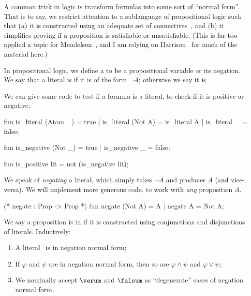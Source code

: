 \begin{node}\label{prop-000P}%
A common trick in logic is transform formulas into some sort of
``normal form''. That is to say, we restrict attention to a sublanguage
of propositional logic such that (a) it is constructed using an adequate
set of connectives~, and (b) it simplifies proving if a
proposition is satisfiable or unsatisfiable. (This is far too applied a
topic for Mendelson~\cite{mendelson2015mathematical}, and I am relying
on Harrison~\cite{harrison2009handbook} for much of the material here.)

\begin{definition}\label{prop-000Q}%
In propositional logic, we define a  to be a
propositional variable or its negation. We say that a literal is
 if it is of the form $\neg A$; otherwise we say it is
.

\begin{node}\label{prop:normal-form-000F}%
We can give some code to test if a formula is a literal, to check if it
is positive or negative:

\begin{sml}
fun is_literal (Atom _) = true
 |  is_literal (Not A) = is_literal A
 |  is_literal _ = false;

fun is_negative (Not _) = true
 |  is_negative _ = false;

fun is_positive lit = not (is_negative lit);
\end{sml}
\end{node}

\begin{node}[Negation]\label{prop:normal-form-000G}%
We speak of \emph{negating} a literal, which simply takes $\neg A$ and
produces $A$ (and vice-versa). We will implement more generous code, to
work with \emph{any} proposition $A$.

\begin{sml}
(* negate : Prop -> Prop *)
fun negate (Not A) = A
 |  negate A = Not A;
\end{sml}
\end{node}
\end{definition}

\begin{definition}\label{prop-000O}%
We say a proposition is in  if it is
constructed using conjunctions and disjunctions of
literals. Inductively:
\begin{enumerate}
\item A literal~ is in negation normal form;
\item If $\varphi$ and $\psi$ are in negation normal form, then so are
  $\varphi\land\psi$ and $\varphi\lor\psi$;
\item We nominally accept $\verum$ and $\falsum$ as ``degenerate'' cases
  of negation normal form.
\end{enumerate}
\end{definition}


\end{node}
